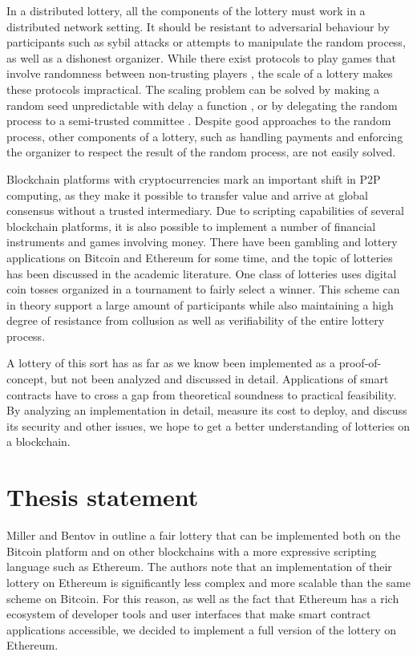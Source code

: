 In a distributed lottery, all the components of the lottery must work in a distributed network setting. It should be resistant to adversarial behaviour by participants such as sybil attacks \cite{douceur2002sybil} or attempts to manipulate the random process, as well as a dishonest organizer. While there exist protocols to play games that involve randomness between non-trusting players \cite{shamir_mental_1981, blum1983coin, broder_provably_1985, goldreich_how_1987}, the scale of a lottery makes these protocols impractical. The scaling problem can be solved by making a random seed unpredictable with delay a function \cite{goldschlag_publicly_1998}, or by delegating the random process to a semi-trusted committee \cite{fouque_sharing_2001}. Despite good approaches to the random process, other components of a lottery, such as handling payments and enforcing the organizer to respect the result of the random process, are not easily solved. 

Blockchain platforms with cryptocurrencies mark an important shift in P2P computing, as they make it possible to transfer value and arrive at global consensus without a trusted intermediary. Due to scripting capabilities of several blockchain platforms, it is also possible to implement a number of financial instruments and games involving money. There have been gambling and lottery applications on Bitcoin and Ethereum for some time, and the topic of lotteries has been discussed in the academic literature. One class of lotteries uses digital coin tosses organized in a tournament to fairly select a winner. This scheme can in theory support a large amount of participants while also maintaining a high degree of resistance from collusion as well as verifiability of the entire lottery process.

A lottery of this sort has as far as we know been implemented as a proof-of-concept, but not been analyzed and discussed in detail. Applications of smart contracts have to cross a gap from theoretical soundness to practical feasibility. By analyzing an implementation in detail, measure its cost to deploy, and discuss its security and other issues, we hope to get a better understanding of lotteries on a blockchain.

\section{Thesis statement}
\label{sec:statement}

Miller and Bentov in \cite{miller_zero-collateral_2017} outline a fair lottery that can be implemented both on the Bitcoin platform and on other blockchains with a more expressive scripting language such as Ethereum. The authors note that an implementation of their lottery on Ethereum is significantly less complex and more scalable than the same scheme on Bitcoin. For this reason, as well as the fact that Ethereum has a rich ecosystem of developer tools and user interfaces that make smart contract applications accessible, we decided to implement a full version of the lottery on Ethereum. 

